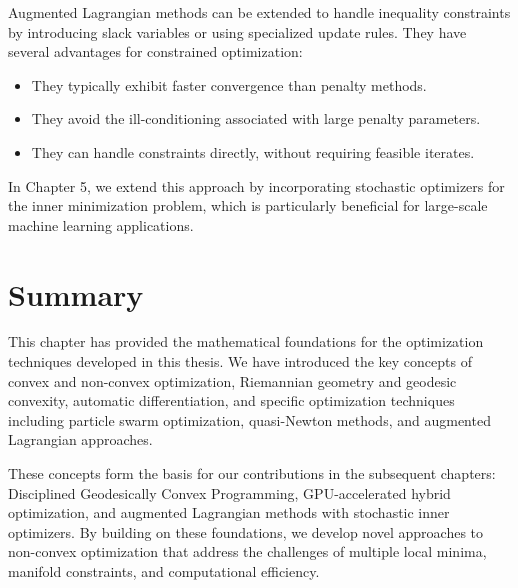 Augmented Lagrangian methods can be extended to handle inequality constraints by introducing slack variables or using specialized update rules. They have several advantages for constrained optimization:

\begin{itemize}
\item They typically exhibit faster convergence than penalty methods.
\item They avoid the ill-conditioning associated with large penalty parameters.
\item They can handle constraints directly, without requiring feasible iterates.
\end{itemize}

In Chapter 5, we extend this approach by incorporating stochastic optimizers for the inner minimization problem, which is particularly beneficial for large-scale machine learning applications.

\section{Summary}

This chapter has provided the mathematical foundations for the optimization techniques developed in this thesis. We have introduced the key concepts of convex and non-convex optimization, Riemannian geometry and geodesic convexity, automatic differentiation, and specific optimization techniques including particle swarm optimization, quasi-Newton methods, and augmented Lagrangian approaches.

These concepts form the basis for our contributions in the subsequent chapters: Disciplined Geodesically Convex Programming, GPU-accelerated hybrid optimization, and augmented Lagrangian methods with stochastic inner optimizers. By building on these foundations, we develop novel approaches to non-convex optimization that address the challenges of multiple local minima, manifold constraints, and computational efficiency.
